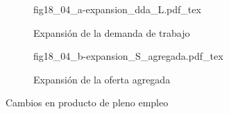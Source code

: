 \begin{figure}[h]
\captionsetup[subfigure]{aboveskip=15pt,belowskip=15pt}
\centering
\begin{subfigure}{.45\textwidth}
  \centering
        \def\svgwidth{\textwidth}
        {fig18_04_a-expansion_dda_L.pdf_tex}
  \caption{Expansión de la demanda de trabajo}
  \label{fig18_04_a-expansion_dda_L}
\end{subfigure}\hspace{.05\textwidth}
\begin{subfigure}{.45\textwidth}
  \centering
        \def\svgwidth{\textwidth}
        {fig18_04_b-expansion_S_agregada.pdf_tex}
  \caption{Expansión de la oferta agregada}
  \label{fig18_04_b-expansion_S_agregada}
\end{subfigure}
\caption{Cambios en producto de pleno empleo}
\label{fig18_04-cambios_producto_pleno_empleo}
\end{figure}